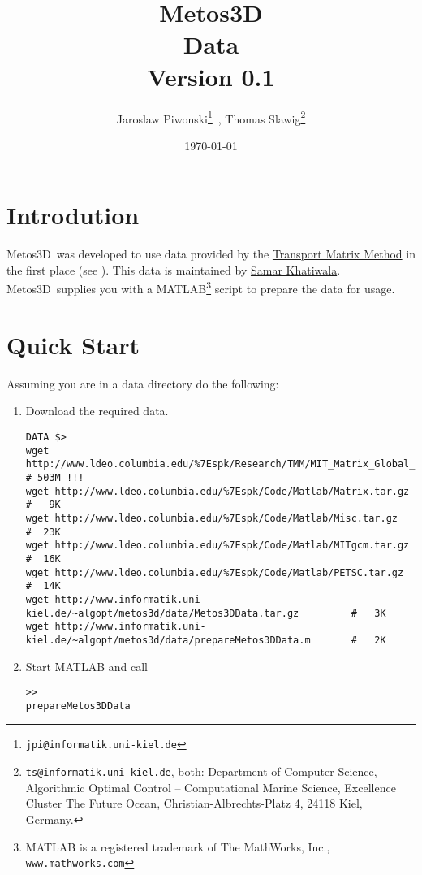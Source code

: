 \documentclass{article}
\newcommand{\VERSION}{{0.1}}
\newcommand{\Metos}{{\sc Metos3D}}
\begin{document}
%
%
\title{
\Metos \\
\bigskip
Data \\
{\small Version \VERSION}
}
\author{
Jaroslaw Piwonski\thanks{\texttt{jpi@informatik.uni-kiel.de}} \,,
Thomas Slawig\thanks{\texttt{ts@informatik.uni-kiel.de},
both: Department of Computer Science, Algorithmic Optimal Control -- Computational Marine Science,
Excellence Cluster The Future Ocean, Christian-Albrechts-Platz 4, 24118 Kiel, Germany.}
}
\date{\today}
\maketitle

%
%
\section{Introdution}

\Metos\ was developed to use data provided by the
\href{http://www.ldeo.columbia.edu/~spk/Research/TMM/tmm.html}{Transport Matrix Method}
in the first place (see \cite{KhViCa05}).
This data is maintained by
\href{http://www.ldeo.columbia.edu/~spk/}{Samar Khatiwala}.
\Metos\ supplies you with a
MATLAB\footnote{MATLAB is a registered trademark of The MathWorks, Inc., 
\texttt{www.mathworks.com}}
script to prepare the data for usage.

%
%
\section{Quick Start}

Assuming you are in a data directory do the following:

\begin{enumerate}
\item Download the required data.
\begin{verbatim}
DATA $>
wget http://www.ldeo.columbia.edu/%7Espk/Research/TMM/MIT_Matrix_Global_2.8deg.tar.gz  # 503M !!! 
wget http://www.ldeo.columbia.edu/%7Espk/Code/Matlab/Matrix.tar.gz                     #   9K
wget http://www.ldeo.columbia.edu/%7Espk/Code/Matlab/Misc.tar.gz                       #  23K
wget http://www.ldeo.columbia.edu/%7Espk/Code/Matlab/MITgcm.tar.gz                     #  16K
wget http://www.ldeo.columbia.edu/%7Espk/Code/Matlab/PETSC.tar.gz                      #  14K
wget http://www.informatik.uni-kiel.de/~algopt/metos3d/data/Metos3DData.tar.gz         #   3K
wget http://www.informatik.uni-kiel.de/~algopt/metos3d/data/prepareMetos3DData.m       #   2K
\end{verbatim}
\item Start MATLAB and call
\begin{verbatim}
>>
prepareMetos3DData
\end{verbatim}
\end{enumerate}
\end{document}
